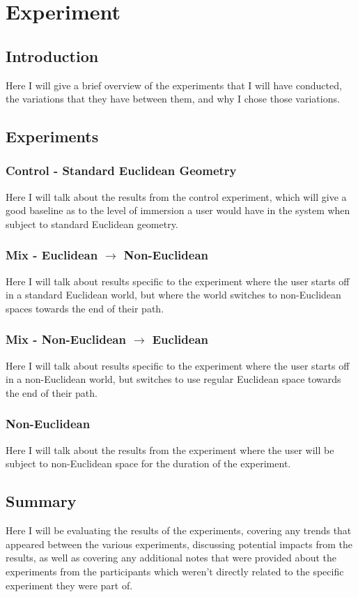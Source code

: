 \chapter{Experiment}
\label{exp}
\begin{multicols*}{2}

	\section{Introduction}
	Here I will give a brief overview of the experiments that I will have conducted, the variations that they have between them, and why I chose those variations.

	\section{Experiments}
		\subsection{Control - Standard Euclidean Geometry}
		Here I will talk about the results from the control experiment, which will give a good baseline as to the level of immersion a user would have in the system when subject to standard Euclidean geometry.

		\subsection{Mix - Euclidean $\rightarrow$ Non-Euclidean}
		Here I will talk about results specific to the experiment where the user starts off in a standard Euclidean world, but where the world switches to non-Euclidean spaces towards the end of their path.

		\subsection{Mix - Non-Euclidean $\rightarrow$ Euclidean}
		Here I will talk about results specific to the experiment where the user starts off in a non-Euclidean world, but switches to use regular Euclidean space towards the end of their path.

		\subsection{Non-Euclidean}
		Here I will talk about the results from the experiment where the user will be subject to non-Euclidean space for the duration of the experiment.

	\section{Summary}
	Here I will be evaluating the results of the experiments, covering any trends that appeared between the various experiments, discussing potential impacts from the results, as well as covering any additional notes that were provided about the experiments from the participants which weren't directly related to the specific experiment they were part of.

\end{multicols*}

